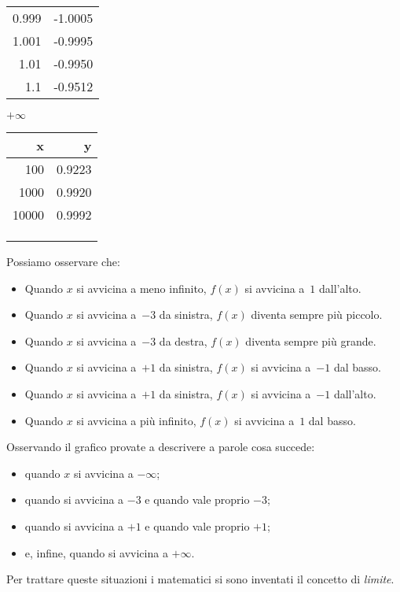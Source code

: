 \begin{esempio}
\begin{minipage}{.24\textwidth}
\begin{center}
\begin{tabular}{r|r}
0.999 & -1.0005 \\
1.001 & -0.9995 \\
1.01 & -0.9950 \\
1.1 & -0.9512 \\
\end{tabular}
\end{center}
\end{minipage}
\begin{minipage}{.24\textwidth}
\begin{center}
\(+\infty\)\\
\begin{tabular}{r|r}
x & y\\\hline
100 & 0.9223 \\
1000 & 0.9920 \\
10000 & 0.9992 \\
&\\
&\\
&
\end{tabular}
\end{center}
\end{minipage}
Possiamo osservare che:
\begin{itemize} [nosep]
 \item 
Quando $x$ si avvicina a meno infinito, $f(x)$ si avvicina a~$1$ dall'alto.
 \item 
Quando $x$ si avvicina a~$-3$ da sinistra, $f(x)$ diventa sempre più 
piccolo.
 \item 
Quando $x$ si avvicina a~$-3$ da destra, $f(x)$ diventa sempre più 
grande.
 \item 
Quando $x$ si avvicina a~$+1$ da sinistra, $f(x)$  si avvicina a~$-1$ dal 
basso.
 \item 
Quando $x$ si avvicina a~$+1$ da sinistra, $f(x)$  si avvicina a~$-1$ 
dall'alto.
 \item 
Quando $x$ si avvicina a più infinito, $f(x)$ si avvicina a~$1$ dal basso.
\end{itemize}
\begin{center}\scalebox{.6}{\graficoa}\end{center}
\end{esempio}

Osservando il grafico provate a descrivere a parole cosa succede: 
\begin{itemize} [nosep]
 \item quando $x$ si avvicina a \(-\infty\); 
 \item quando si avvicina a $-3$ e quando vale proprio $-3$;
 \item quando si avvicina a $+1$ e quando vale proprio $+1$; 
 \item e, infine, quando si avvicina a \(+\infty\).
\end{itemize}
\vspace{1em}
Per trattare queste situazioni i matematici si sono inventati il concetto di 
\emph{limite}.

